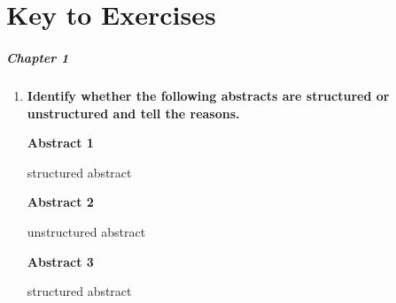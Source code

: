 \documentclass{ctexbook}
\begin{document}
\restoregeometry

\chapter*{Key to Exercises}

\paragraph*{Chapter 1}\par
\begin{enumerate}
  \item \textbf{Identify whether the following abstracts are structured or unstructured and tell the reasons.}
  
  \textbf{Abstract 1}
  
  \hspace*{2em}structured abstract 
  
  \textbf{Abstract 2}

  \hspace*{2em}unstructured abstract 
  
  \textbf{Abstract 3}

  \hspace*{2em}structured abstract
\end{enumerate}
\end{document}
